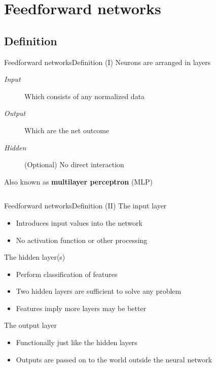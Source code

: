 \documentclass[10pt,compress]{beamer} %
\begin{document}
\section{Feedforward networks}
\subsection{Definition}
\begin{frame}{Feedforward networks}{Definition (I)}
	Neurons are arranged in \alert{layers}
	\begin{description}
	\item[\textit{Input}] Which consists of any normalized data
	\item[\textit{Output}] Which are the net outcome
	\item[\textit{Hidden}] (Optional) No direct interaction
	\end{description}

	Also known as \textbf{multilayer perceptron} (MLP)

	\bigskip

    \begin{columns}
            
    \end{columns}
\end{frame}

\begin{frame}{Feedforward networks}{Definition (II)}
	The input layer
	\begin{itemize}
	\item Introduces input values into the network
	\item No activation function or other processing
	\end{itemize}
	The hidden layer(s)
	\begin{itemize}
	\item Perform classification of features
	\item Two hidden layers are sufficient to solve any problem
	\item Features imply more layers may be better
	\end{itemize}
	The output layer
	\begin{itemize}
	\item Functionally just like the hidden layers
	\item Outputs are passed on to the world outside the neural network
	\end{itemize}
\end{frame}
\end{document}
